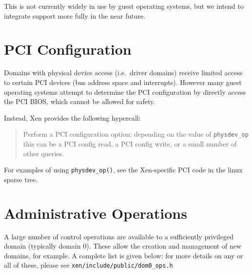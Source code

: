 \documentclass[11pt,twoside,final,openright]{xenstyle}
\begin{document}
This is not currently widely in use by guest operating systems, but 
we intend to integrate support more fully in the near future. 

\section{PCI Configuration} 

Domains with physical device access (i.e.\ driver domains) receive
limited access to certain PCI devices (bus address space and
interrupts). However many guest operating systems attempt to 
determine the PCI configuration by directly access the PCI BIOS, 
which cannot be allowed for safety. 

Instead, Xen provides the following hypercall: 

\begin{quote}

Perform a PCI configuration option; depending on the value 
of {\tt physdev\_op} this can be a PCI config read, a PCI config 
write, or a small number of other queries. 

\end{quote} 


For examples of using {\tt physdev\_op()}, see the 
Xen-specific PCI code in the linux sparse tree. 

\section{Administrative Operations}
\label{s:dom0ops}

A large number of control operations are available to a sufficiently
privileged domain (typically domain 0). These allow the creation and
management of new domains, for example. A complete list is given 
below: for more details on any or all of these, please see 
{\tt xen/include/public/dom0\_ops.h} 
\end{document}
